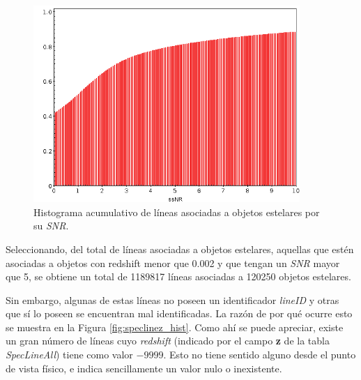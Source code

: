 \begin{figure}[h!]
\begin{center}
\includegraphics[width=0.9\textwidth]{imagenes/stelar_obj_snr_hist.png}
\end{center}
\vspace*{-5mm}
\caption{Histograma acumulativo de líneas asociadas a objetos estelares por su \textit{SNR}.}
\label{fig:stelar_obj_snr}
\end{figure}

Seleccionando, del total de líneas asociadas a objetos estelares, aquellas que estén asociadas a objetos con redshift menor que 0.002 y que tengan un \textit{SNR} mayor que 5, se obtiene un total de 1189817 líneas asociadas a 120250 objetos estelares. 

Sin embargo, algunas de estas líneas no poseen un identificador \textit{lineID} y otras que sí lo poseen se encuentran mal identificadas. La razón de por qué ocurre esto se muestra en la Figura \ref{fig:speclinez_hist}. Como ahí se puede apreciar, existe un gran número de líneas cuyo \textit{redshift} (indicado por el campo \textbf{z} de la tabla \textit{SpecLineAll}) tiene como valor ${-9999}$. Esto no tiene sentido alguno desde el punto de vista físico, e indica sencillamente un valor nulo o inexistente.

